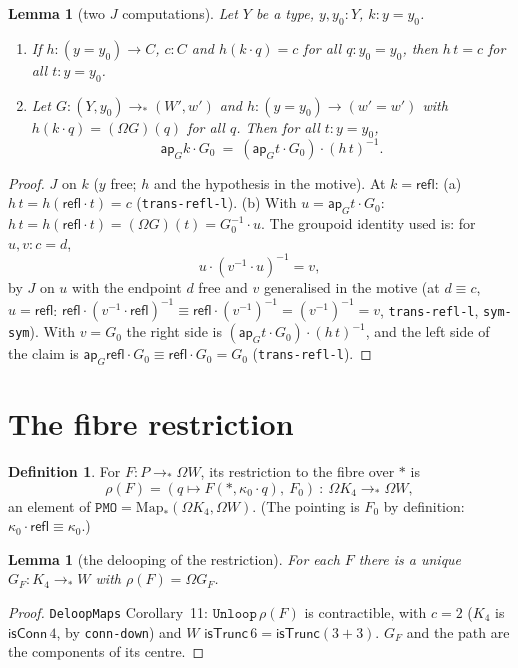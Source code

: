 \documentclass[11pt]{amsart}
\newtheorem{lemma}[theorem]{Lemma}
\theoremstyle{definition}
\newtheorem{definition}[theorem]{Definition}
\theoremstyle{remark}
\newcommand{\Om}{\Omega}
\newcommand{\Map}{\mathrm{Map}_*}
\newcommand{\code}[1]{\texttt{#1}}
\newcommand{\cT}{\mathsf{isTrunc}}
\newcommand{\cC}{\mathsf{isConn}}
\newcommand{\refl}{\mathsf{refl}}
\newcommand{\ap}{\mathsf{ap}}
\begin{document}
\begin{lemma}[two $J$ computations]\label{l:J}
Let $Y$ be a type, $y,y_0:Y$, $k:y=y_0$.
\begin{enumerate}
\item[(a)] If $h:(y=y_0)\to C$, $c:C$ and $h(k\cdot q)=c$ for all
  $q:y_0=y_0$, then $h\,t=c$ for all $t:y=y_0$.
\item[(b)] Let $G:(Y,y_0)\to_*(W',w')$ and $h:(y=y_0)\to(w'=w')$ with
  $h(k\cdot q)=(\Om G)(q)$ for all $q$. Then for all $t:y=y_0$,
  \[\ap_Gk\cdot G_0\ =\ (\ap_Gt\cdot G_0)\cdot(h\,t)^{-1}.\]
\end{enumerate}
\end{lemma}
\begin{proof}
$J$ on $k$ ($y$ free; $h$ and the hypothesis in the motive). At
$k=\refl$: (a) $h\,t=h(\refl\cdot t)=c$ (\code{trans-refl-l}).
(b) With $u=\ap_Gt\cdot G_0$: $h\,t=h(\refl\cdot t)=(\Om G)(t)=G_0^{-1}\cdot u$.
The groupoid identity used is: for $u,v:c=d$,
\[u\cdot(v^{-1}\cdot u)^{-1}=v,\]
by $J$ on $u$ with the endpoint $d$ free and $v$ generalised in the motive
(at $d\equiv c$, $u=\refl$: $\refl\cdot(v^{-1}\cdot\refl)^{-1}\equiv\refl\cdot(v^{-1})^{-1}
=(v^{-1})^{-1}=v$, \code{trans-refl-l}, \code{sym-sym}). With $v=G_0$ the
right side is $(\ap_Gt\cdot G_0)\cdot(h\,t)^{-1}$, and the left side of the
claim is $\ap_G\refl\cdot G_0\equiv\refl\cdot G_0=G_0$ (\code{trans-refl-l}).
\end{proof}

\section{The fibre restriction}

\begin{definition}\label{d:res}
For $F:P\to_*\Om W$, its restriction to the fibre over $*$ is
\[\rho(F)=(q\mapsto F(*,\kappa_0\cdot q),\ F_0)\ :\ \Om K_4\to_*\Om W,\]
an element of $\code{PMO}=\Map(\Om K_4,\Om W)$. (The pointing is $F_0$ by
definition: $\kappa_0\cdot\refl\equiv\kappa_0$.)
\end{definition}

\begin{lemma}[the delooping of the restriction]\label{l:deloop}
For each $F$ there is a unique $G_F:K_4\to_*W$ with $\rho(F)=\Om G_F$.
\end{lemma}
\begin{proof}
\code{DeloopMaps} Corollary~11: $\code{Unloop}\,\rho(F)$ is contractible, with
$c=2$ ($K_4$ is $\cC\,4$, by \code{conn-down}) and $W$ $\cT\,6=\cT(3+3)$.
$G_F$ and the path are the components of its centre.
\end{proof}
\end{document}
